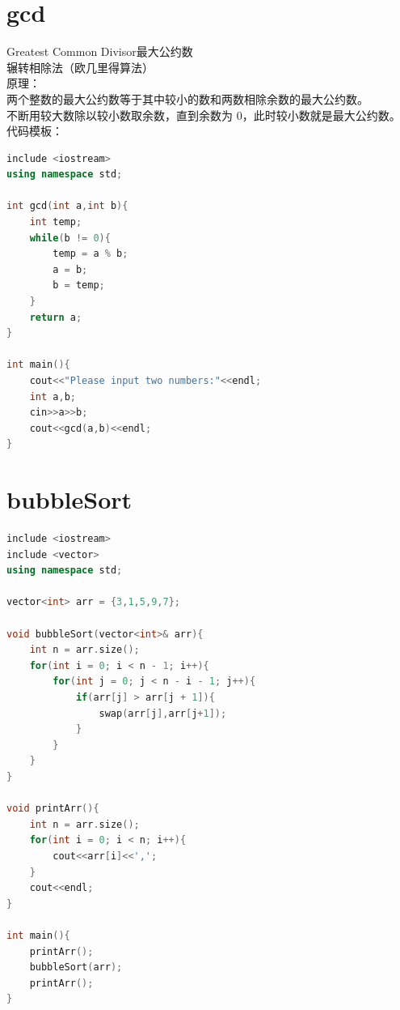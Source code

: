 \documentclass[12pt,twiside,a4paper]{ctexbook}
\numberwithin{chapter}{part}
\begin{document}
\section{gcd}
Greatest Common Divisor最大公约数\\
辗转相除法（欧几里得算法）\\
原理：\\
两个整数的最大公约数等于其中较小的数和两数相除余数的最大公约数。\\
不断用较大数除以较小数取余数，直到余数为 0，此时较小数就是最大公约数。\\
代码模板：
\begin{lstlisting}[language=C++]
include <iostream>
using namespace std;

int gcd(int a,int b){
	int temp;
	while(b != 0){
		temp = a % b;
		a = b;
		b = temp;
	}
	return a;
}

int main(){
	cout<<"Please input two numbers:"<<endl;
	int a,b;
	cin>>a>>b;
	cout<<gcd(a,b)<<endl;
}
\end{lstlisting}

\section{bubbleSort}
\begin{lstlisting}[language=C++]
include <iostream>
include <vector>
using namespace std;

vector<int> arr = {3,1,5,9,7};

void bubbleSort(vector<int>& arr){
	int n = arr.size();
	for(int i = 0; i < n - 1; i++){
		for(int j = 0; j < n - i - 1; j++){
			if(arr[j] > arr[j + 1]){
				swap(arr[j],arr[j+1]);
			}
		}
	}
}

void printArr(){
	int n = arr.size();
	for(int i = 0; i < n; i++){
		cout<<arr[i]<<',';
	}
	cout<<endl;
}

int main(){
	printArr();
	bubbleSort(arr);
	printArr();
}
\end{lstlisting}
\end{document}
